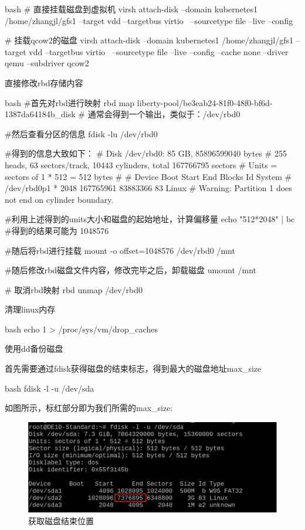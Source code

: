 \begin{outline}[enumerate]
\begin{code-in-enumerate}{bash}
# 直接挂载磁盘到虚拟机
virsh attach-disk --domain kubernetes1  /home/zhangjl/gfs1 --target vdd --targetbus virtio  \
    --sourcetype file --live --config

# 挂载qcow2的磁盘
virsh attach-disk --domain kubernetes1  /home/zhangjl/gfs1 --target vdd --targetbus virtio  \
    --sourcetype file --live --config --cache none --driver qemu --subdriver qcow2
\end{code-in-enumerate}

\1 直接修改rbd存储内容
\begin{code-in-enumerate}{bash}
#首先对rbd进行映射
rbd map liberty-pool/be3eab24-81f0-48f0-bf6d-1387da64184b_disk
# 通常会得到一个输出，类似于：/dev/rbd0

#然后查看分区的信息
fdisk -lu /dev/rbd0

#得到的信息大致如下：
# Disk /dev/rbd0: 85 GB, 85896599040 bytes
# 255 heads, 63 sectors/track, 10443 cylinders, total 167766795 sectors
# Units = sectors of 1 * 512 = 512 bytes
#
#     Device Boot      Start         End      Blocks   Id  System
# /dev/rbd0p1   *        2048   167765961    83883366   83  Linux
# Warning: Partition 1 does not end on cylinder boundary.

#利用上述得到的units大小和磁盘的起始地址，计算偏移量
echo "512*2048" | bc
#得到的结果可能为 1048576

#随后将rbd进行挂载
mount -o offset=1048576 /dev/rbd0 /mnt

#随后修改rbd磁盘文件内容，修改完毕之后，卸载磁盘
umount /mnt

# 取消rbd映射
rbd unmap /dev/rbd0
\end{code-in-enumerate}

\1 清理linux内存
\begin{code-in-enumerate}{bash}
echo 1 > /proc/sys/vm/drop_caches
\end{code-in-enumerate}

\1 使用dd备份磁盘

首先需要通过fdisk获得磁盘的结束标志，得到最大的磁盘地址max\_size
\begin{code-in-enumerate}{bash}
fdisk -l -u /dev/sda
\end{code-in-enumerate}

如图所示，标红部分即为我们所需的max\_size:
\begin{figure}[H]
  \centering
  \includegraphics[width=\linewidth]{backup.png}
  \caption{获取磁盘结束位置}
  \label{fig:backup}
\end{figure}


\end{outline}
